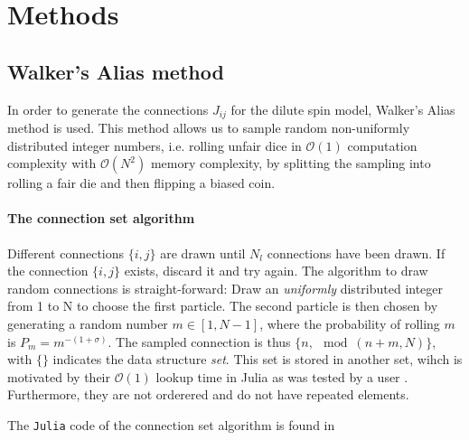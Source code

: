 \section{Methods}
\subsection{Walker's Alias method}

In order to generate the connections $J_{ij}$ for the dilute spin model, Walker's Alias \cite{Walker1974} method is used. This method allows us to sample random non-uniformly distributed integer numbers, i.e. rolling unfair dice in $\mathcal{O}(1)$ computation complexity with $\mathcal{O}(N^2)$ memory complexity, by splitting the sampling into rolling a fair die and then flipping a biased coin. 

\paragraph{The connection set algorithm}%
\label{sub:The connection set algorithm}

Different connections $\{i, j\}$ are drawn until $N_l$ connections have been drawn. If the connection  $\{i, j\}$ exists, discard it and try again. The algorithm to draw random connections is straight-forward: Draw an \textit{uniformly} distributed integer from 1 to N to choose the first particle. The second particle is then chosen by generating a random number $m \in [1, N-1]$, where the probability of rolling $m$ is  $P_m = m^{-(1+\sigma)}$. The sampled connection is thus $\{n, \mod(n+m, N)\}$, with $\{\}$ indicates the data structure \textit{set}. This set is stored in another set, wihch is motivated by their $\mathcal{O}(1)$ lookup time in Julia as was tested by a user \cite{setTime}. Furthermore, they are not orderered and do not have repeated elements.

The \texttt{Julia} code of the connection set algorithm is found in 

